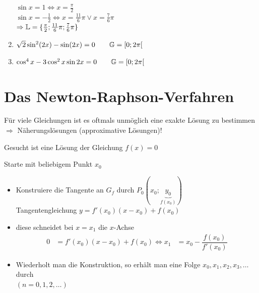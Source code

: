 \begin{enumerate}
	 $\sin x = 1 \Leftrightarrow x = \frac{\pi}{2}$\\
	 $\sin x = -\frac{1}{2} \Leftrightarrow x = \frac{11}{6}\pi \lor x = \frac{7}{6}\pi$\\
	
	$\Rightarrow \mathbb{L} = \{\frac{\pi}{2};\frac{11}{6}\pi;\frac{7}{6}\pi\}$
	
	\item $\sqrt{2}\sin^2(2x)-\sin(2x) = 0 \qquad \mathbb{G}=[0;2\pi[$
	\item $\cos^4x-3\cos^2x\sin2x = 0 \qquad \mathbb{G}=[0;2\pi[$
\end{enumerate}

\section{Das Newton-Raphson-Verfahren}
Für viele Gleichungen ist es oftmals unmöglich eine exakte Lösung zu bestimmen $\Rightarrow$ Näherungslösungen (approximative Lösungen)!

\Bsp

Gesucht ist eine Lösung der Gleichung $f(x) = 0$

Starte mit beliebigem Punkt $x_0$
\begin{itemize}
	\item Konstruiere die Tangente an $G_f$ durch $P_0(x_0;\underbrace{y_0}_{f(x_0)})$\\
	Tangentengleichung $y = f'(x_0)(x-x_0)+f(x_0)$
	
	\item diese schneidet bei $x=x_1$ die $x$-Achse
	\begin{align*}
	0 &= f'(x_0)(x-x_0)+f(x_0)
	\Leftrightarrow x_1 &= x_0 - \dfrac{f(x_0)}{f'(x_0)}
	\end{align*}
	
	\item Wiederholt man die Konstruktion, so erhält man eine Folge $x_0, x_1, x_2, x_3, \ldots$ durch\\
	 \qquad $(n = 0, 1, 2, \ldots)$
\end{itemize}


